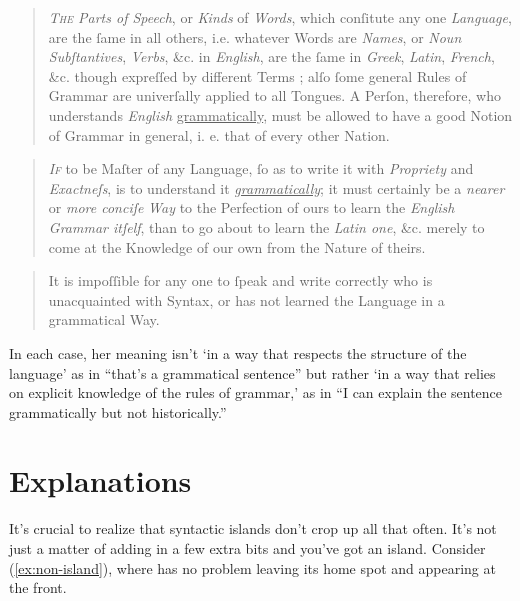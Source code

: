 \begin{quote}
    \textit{T\textsc{he} Parts of Speech}, or \textit{Kinds} of \textit{Words}, which conſitute any one \textit{Language}, are the ſame in all others, i.e. whatever Words are \textit{Names}, or \textit{Noun Subſtantives}, \textit{Verbs}, \&c. in \textit{English}, are the ſame in \textit{Greek}, \textit{Latin}, \textit{French}, \&c. though expreſſed by different Terms ; alſo ſome general Rules of Grammar are univerſally applied to all Tongues. A Perſon, therefore, who understands \textit{English} \uline{grammatically}, must be allowed to have a good Notion of Grammar in general, i. e. that of every other Nation.\hfill \citep[iv]{Fisher1785}
\end{quote}

\begin{quote}
    \textit{I\textsc{f}} to be Maſter of any Language, ſo as to write it with \textit{Propriety} and \textit{Exactneſs}, is to understand it \textit{\uline{grammatically}}; it must certainly be a \textit{nearer} or \textit{more conciſe} \textit{Way} to the Perfection of ours to learn the \textit{English Grammar itſelf}, than to go about to learn the \textit{Latin one}, \&c. merely to come at the Knowledge of our own from the Nature of theirs.\hfill \citep[vii]{Fisher1785}
\end{quote}

\begin{quote}
    It is impoſſible for any one to ſpeak and write correctly who is unacquainted with Syntax, or has not learned the Language in a grammatical Way.\hfill\citep[xii]{Fisher1785}
\end{quote}

In each case, her meaning isn't `in a way that respects the structure of the language' as in \enquote{that's a grammatical sentence} but rather `in a way that relies on explicit knowledge of the rules of grammar,' as in \enquote{I can explain the sentence grammatically but not historically.}

\section{Explanations}

It's crucial to realize that syntactic islands don't crop up all that often. It's not just a matter of adding in a few extra bits and you've got an island. Consider (\ref{ex:non-island}), where  has no problem leaving its home spot and appearing at the front.

